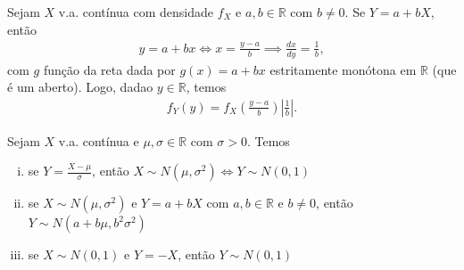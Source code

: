 \documentclass[../Notas.tex]{subfiles}
\begin{document}
\begin{example}
Sejam $X$ v.a. contínua com densidade $f_X$ e $a,b\in\mathbb{R}$ com $b\neq 0$. Se $Y = a + bX$, então
\begin{align*}
    y = a + bx \iff x = \frac{y-a}{b} \implies \frac{dx}{dy} = \frac{1}{b},
\end{align*}
com $g$ função da reta dada por $g(x) = a + bx$ estritamente monótona em $\mathbb{R}$ (que é um aberto). Logo, dadao $y\in\mathbb{R}$, temos
\begin{align*}
    f_Y(y) = f_X\left( \frac{y-a}{b} \right)\left|\frac{1}{b}\right|.
\end{align*}
\end{example}

\begin{proposition}
Sejam $X$ v.a. contínua e $\mu, \sigma\in\mathbb{R}$ com $\sigma > 0$. Temos
\begin{enumerate}[(i)]
    \item se $Y = \displaystyle{ \frac{X-\mu}{\sigma} }$, então $X\sim N(\mu, \sigma^2) \iff Y\sim N(0,1)$
    \item se $X\sim N(\mu, \sigma^2)$ e $Y = a + bX$ com $a,b\in\mathbb{R}$ e $b\neq 0$, então $Y\sim N(a+b\mu, b^2\sigma^2)$
    \item se $X\sim N(0,1)$ e $Y=-X$, então $Y\sim N(0,1)$
\end{enumerate}
\end{proposition}
\end{document}
